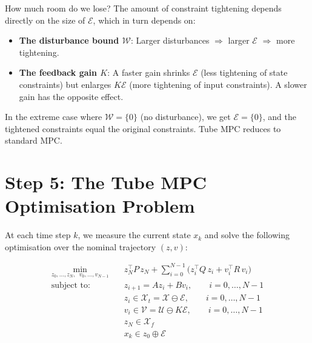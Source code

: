 \begin{notebox}{How much room do we lose?}
	The amount of constraint tightening depends directly on the size of $\mathcal{E}$, which in turn depends on:
	\begin{itemize}[noitemsep]
		\item \textbf{The disturbance bound $\mathcal{W}$}: Larger disturbances $\Rightarrow$ larger $\mathcal{E}$ $\Rightarrow$ more tightening.
		\item \textbf{The feedback gain $K$}: A faster gain shrinks $\mathcal{E}$ (less tightening of state constraints) but enlarges $K\mathcal{E}$ (more tightening of input constraints). A slower gain has the opposite effect.
	\end{itemize}

	In the extreme case where $\mathcal{W} = \{0\}$ (no disturbance), we get $\mathcal{E} = \{0\}$, and the tightened constraints equal the original constraints. Tube MPC reduces to standard MPC.
\end{notebox}


\section{Step 5: The Tube MPC Optimisation Problem}
\label{sec:tube_opt}

At each time step $k$, we measure the current state $x_k$ and solve the following optimisation over the nominal trajectory $(z, v)$:

\begin{equation} \label{eq:tube_mpc_opt}
	\begin{aligned}
		\min_{z_0, \ldots, z_N, \;\; v_0, \ldots, v_{N-1}} \quad & z_N^\top P\, z_N + \sum_{i=0}^{N-1} \bigl(z_i^\top Q\, z_i + v_i^\top R\, v_i\bigr) \\[6pt]
		\text{subject to:} \quad
		& z_{i+1} = Az_i + Bv_i, \qquad i = 0, \ldots, N-1 \\
		& z_i \in \mathcal{X}_t = \mathcal{X} \ominus \mathcal{E}, \qquad i = 0, \ldots, N-1 \\
		& v_i \in \mathcal{V} = \mathcal{U} \ominus K\mathcal{E}, \qquad i = 0, \ldots, N-1 \\
		& z_N \in \mathcal{X}_f \\
		& x_k \in z_0 \oplus \mathcal{E}
	\end{aligned}
\end{equation}

